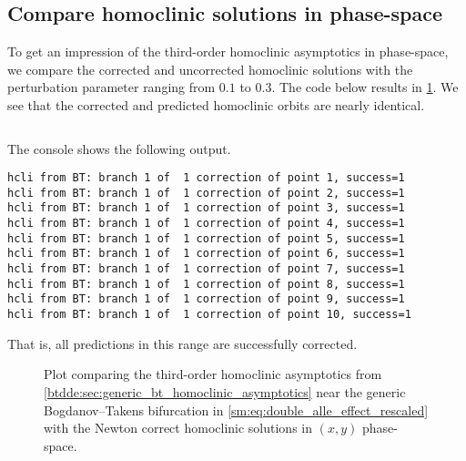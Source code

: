 \subsection{Compare homoclinic solutions in phase-space}
To get an impression of the third-order homoclinic asymptotics in
phase-space, we compare the corrected and uncorrected homoclinic solutions
with the perturbation parameter ranging from $0.1$ to $0.3$.
The code below results in \cref{sm:fig:DoubleAlleeEffectCompareOrbitsPhaseSpace}.
We see that the corrected and predicted homoclinic orbits are nearly identical.
\inputminted[firstline=166, lastline=182]{MATLAB}{\pathToDDEBifToolDemos/predator_prey/predator_prey.m}
The \MATLAB console shows the following output.
\begin{verbatim}
hcli from BT: branch 1 of  1 correction of point 1, success=1
hcli from BT: branch 1 of  1 correction of point 2, success=1
hcli from BT: branch 1 of  1 correction of point 3, success=1
hcli from BT: branch 1 of  1 correction of point 4, success=1
hcli from BT: branch 1 of  1 correction of point 5, success=1
hcli from BT: branch 1 of  1 correction of point 6, success=1
hcli from BT: branch 1 of  1 correction of point 7, success=1
hcli from BT: branch 1 of  1 correction of point 8, success=1
hcli from BT: branch 1 of  1 correction of point 9, success=1
hcli from BT: branch 1 of  1 correction of point 10, success=1
\end{verbatim}
That is, all predictions in this range are successfully corrected.
%
\begin{figure}[ht]
    \centering
    \caption{Plot comparing the third-order homoclinic asymptotics from
    \cref{btdde:sec:generic_bt_homoclinic_asymptotics} near the generic
    Bogdanov--Takens bifurcation in \cref{sm:eq:double_alle_effect_rescaled} with
    the Newton correct homoclinic solutions in $(x,y)$ phase-space.}
    \label{sm:fig:DoubleAlleeEffectCompareOrbitsPhaseSpace}
\end{figure}

